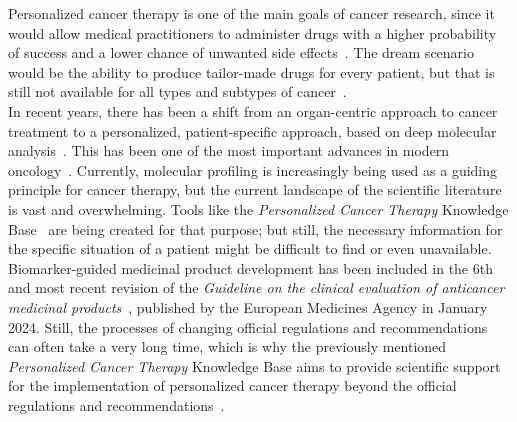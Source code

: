 Personalized cancer therapy is one of the main goals of cancer research, since it would allow medical practitioners to administer drugs with a higher probability of success and a lower chance of unwanted side effects~\cite{meric2012overcoming}. The dream scenario would be the ability to produce tailor-made drugs for every patient, but that is still not available for all types and subtypes of cancer~\cite{personalized_cancer_medicine}.\\
In recent years, there has been a shift from an organ-centric approach to cancer treatment to a personalized, patient-specific approach, based on deep molecular analysis~\cite{personlized-medicine-recent-progress-cancer}. This has been one of the most important advances in modern oncology~\cite{personlized-medicine-recent-progress-cancer}. Currently, molecular profiling is increasingly being used as a guiding principle for cancer therapy, but the current landscape of the scientific literature is vast and overwhelming. Tools like the \textit{Personalized Cancer Therapy} Knowledge Base~\cite{personalized-cancer-therapy} are being created for that purpose; but still, the necessary information for the specific situation of a patient might be difficult to find or even unavailable. Biomarker-guided medicinal product development has been included in the 6th and most recent revision of the \textit{Guideline on the clinical evaluation of anticancer medicinal products}~\cite{ema_guideline}, published by the European Medicines Agency in January 2024. Still, the processes of changing official regulations and recommendations can often take a very long time, which is why the previously mentioned \textit{Personalized Cancer Therapy} Knowledge Base aims to provide scientific support for the implementation of personalized cancer therapy beyond the official regulations and recommendations~\cite{personalized-cancer-therapy}.

